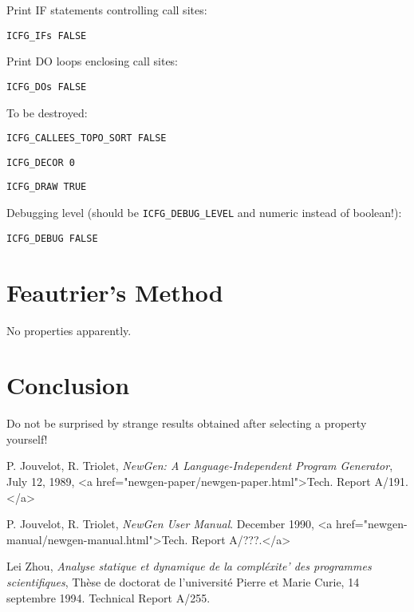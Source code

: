 Print IF statements controlling call sites:

\begin{verbatim}
ICFG_IFs FALSE
\end{verbatim}

Print DO loops enclosing call sites:

\begin{verbatim}
ICFG_DOs FALSE
\end{verbatim}

To be destroyed:

\begin{verbatim}
ICFG_CALLEES_TOPO_SORT FALSE
\end{verbatim}

\begin{verbatim}
ICFG_DECOR 0
\end{verbatim}

\begin{verbatim}
ICFG_DRAW TRUE
\end{verbatim}

Debugging level (should be \verb+ICFG_DEBUG_LEVEL+ and numeric instead
of boolean!):

\begin{verbatim}
ICFG_DEBUG FALSE
\end{verbatim}




\section{Feautrier's Method}
\label{section-feautrier}

No properties apparently.




\section*{Conclusion}

Do not be surprised by strange results obtained after selecting a
property yourself!

\begin{thebibliography}{99}

 P. Jouvelot, R. Triolet, 
{\em NewGen: A Language-Independent Program Generator},
July 12, 1989, 
<a href="newgen-paper/newgen-paper.html">Tech. Report A/191.</a>

 P. Jouvelot, R. Triolet, 
{\em NewGen User Manual}. December
1990, <a href="newgen-manual/newgen-manual.html">Tech. Report A/???.</a>

 Lei Zhou,
{\em Analyse statique et dynamique de la compl\'exite' des programmes
scientifiques}, 
Th\`ese de doctorat de l'universit\'e Pierre et Marie Curie, 14
septembre 1994. Technical Report A/255.

\end{thebibliography}


